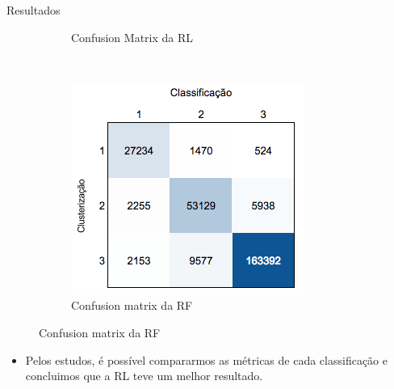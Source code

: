 \documentclass[final,hyperref={pdfpagelabels=false, brazil}]{beamer}
\let\olditem=\item%
\renewcommand{\item}{\olditem \justifying}%
\begin{document}
\begin{frame}[t]
\begin{columns}[t]
\begin{column}{.465\textwidth}
\begin{block}{Resultados}
\begin{itemize}
\begin{itemize}
\begin{figure}[t!]
\begin{subfigure}[t]{0.42\textwidth}
        \caption{Confusion Matrix da RL}
    \end{subfigure}%
    ~ 
    \begin{subfigure}[t]{0.43\textwidth}
        \centering
        \includegraphics[width=1\linewidth]{CM-RF-abs.png}
        \caption{Confusion matrix da RF}
    \end{subfigure}


\end{figure}





\end{itemize}

\begin{itemize}
\item Pelos estudos, é possível compararmos as métricas de cada classificação e concluimos que a RL teve um melhor resultado.






\end{itemize}
\end{itemize}
\end{block}
\end{column}
\end{columns}
\end{frame}
\end{document}
